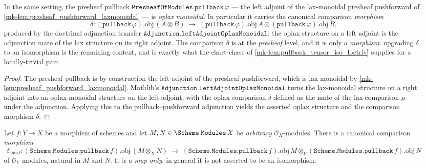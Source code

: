 \begin{lemma}\label{mk-lem:presheaf_pullback_oplaxmonoidal}
  \leanok

  In the same setting, the presheaf pullback \(\mathtt{PresheafOfModules.pullback}\,\varphi\)
  --- the left adjoint of the lax-monoidal presheaf pushforward of
  \ref{mk-lem:presheaf_pushforward_laxmonoidal} --- is \emph{oplax monoidal}. In
  particular it carries the canonical comparison \emph{morphism}
  \[
    \delta :
      (\mathtt{pullback}\,\varphi).\mathrm{obj}\,(A \otimes B)
      \;\longrightarrow\;
      (\mathtt{pullback}\,\varphi).\mathrm{obj}\,A
        \otimes (\mathtt{pullback}\,\varphi).\mathrm{obj}\,B,
  \]
  produced by the doctrinal adjunction transfer
  \(\mathtt{Adjunction.leftAdjointOplaxMonoidal}\): the oplax structure on a left
  adjoint is the adjunction mate of the lax structure on its right adjoint. The
  comparison \(\delta\) is at the \emph{presheaf} level, and it is only a
  \emph{morphism}: upgrading \(\delta\) to an isomorphism is the remaining content, and
  is exactly what the chart-chase of \ref{mk-lem:pullback_tensor_iso_loctriv}
  supplies for a locally-trivial pair.
\end{lemma}

\begin{proof}
  \leanok
  The presheaf pullback is by construction the left adjoint of the presheaf pushforward,
  which is lax monoidal by \ref{mk-lem:presheaf_pushforward_laxmonoidal}. Mathlib's
  \(\mathtt{Adjunction.leftAdjointOplaxMonoidal}\) turns the lax-monoidal structure on a
  right adjoint into an oplax-monoidal structure on the left adjoint, with the oplax
  comparison \(\delta\) defined as the mate of the lax comparison \(\mu\) under the
  adjunction. Applying this to the pullback--pushforward adjunction yields the asserted
  oplax structure and the comparison morphism \(\delta\).
\end{proof}

\begin{lemma}\label{mk-lem:pullback_tensor_map}
  \leanok

  Let \(f : Y \to X\) be a morphism of schemes and let
  \(M, N \in \Scheme.\mathtt{Modules}\,X\) be \emph{arbitrary} \(\mathcal{O}_X\)-modules.
  There is a canonical comparison \emph{morphism}
  \[
    \delta_{\mathrm{sheaf}} :
      (\mathtt{Scheme.Modules.pullback}\,f).\mathrm{obj}\,(M \otimes_X N)
      \;\longrightarrow\;
      (\mathtt{Scheme.Modules.pullback}\,f).\mathrm{obj}\,M
        \otimes_Y (\mathtt{Scheme.Modules.pullback}\,f).\mathrm{obj}\,N
  \]
  of \(\mathcal{O}_Y\)-modules, natural in \(M\) and \(N\). It is a \emph{map only}: in
  general it is not asserted to be an isomorphism.
\end{lemma}

